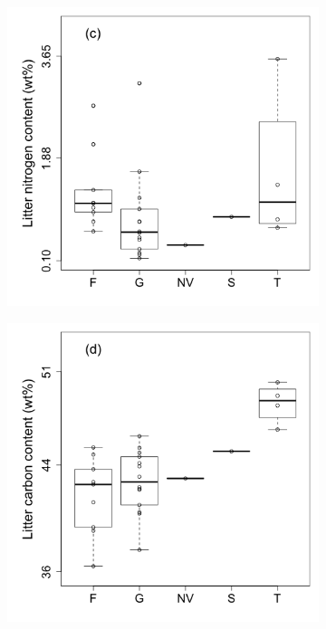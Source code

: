 \documentclass{article}
\begin{document}
\begin{figure}
\begin{subfigure}[!ht]{0.3\textwidth}
	\end{subfigure}
	\begin{subfigure}[!ht]{0.3\textwidth}
		\includegraphics[width=\textwidth]{figs/N_boxplot.png}
	\end{subfigure}
	\smallskip
	\begin{subfigure}[!ht]{0.3\textwidth}
		\includegraphics[width=\textwidth]{figs/C_boxplot.png}

\end{subfigure}
\end{figure}
\end{document}
